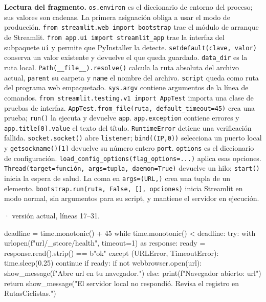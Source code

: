 \documentclass[11pt,a4paper]{article}
\begin{document}
\textbf{Lectura del fragmento.} \texttt{os.environ} es el diccionario de entorno del proceso; sus valores son cadenas. La primera asignación obliga a usar el modo de producción. \texttt{from streamlit.web import bootstrap} trae el módulo de arranque de Streamlit. \texttt{from app.ui import streamlit\_app} trae la interfaz del subpaquete \texttt{ui} y permite que PyInstaller la detecte. \texttt{setdefault(clave, valor)} conserva un valor existente y devuelve el que queda guardado. \texttt{data\_dir} es la ruta local. \texttt{Path(\_\_file\_\_).resolve()} calcula la ruta absoluta del archivo actual, \texttt{parent} su carpeta y \texttt{name} el nombre del archivo. \texttt{script} queda como ruta del programa web empaquetado. \texttt{sys.argv} contiene argumentos de la línea de comandos. \texttt{from streamlit.testing.v1 import AppTest} importa una clase de pruebas de interfaz. \texttt{AppTest.from\_file(ruta, default\_timeout=45)} crea una prueba; \texttt{run()} la ejecuta y devuelve \texttt{app}. \texttt{app.exception} contiene errores y \texttt{app.title[0].value} el texto del título. \texttt{RuntimeError} detiene una verificación fallida. \texttt{socket.socket()} abre \texttt{listener}; \texttt{bind((IP,0))} selecciona un puerto local y \texttt{getsockname()[1]} devuelve su número entero \texttt{port}. \texttt{options} es el diccionario de configuración. \texttt{load\_config\_options(flag\_options=...)} aplica esas opciones. \texttt{Thread(target=función, args=tupla, daemon=True)} devuelve un hilo; \texttt{start()} inicia la espera de salud. La coma en \texttt{args=(URL,)} crea una tupla de un elemento. \texttt{bootstrap.run(ruta, False, [], opciones)} inicia Streamlit en modo normal, sin argumentos para su script, y mantiene el servidor en ejecución.


\smallskip
{\footnotesize\texttt{} · versión actual, líneas 17--31.}\par
\begin{Codigo}[firstnumber=17]
    deadline = time.monotonic() + 45
    while time.monotonic() < deadline:
        try:
            with urlopen(f"{url}/_stcore/health", timeout=1) as response:
                ready = response.read().strip() == b"ok"
        except (URLError, TimeoutError):
            time.sleep(0.25)
            continue
        if ready:
            if not webbrowser.open(url):
                show_message(f"Abre {url} en tu navegador.")
            else:
                print(f"Navegador abierto: {url}")
            return
    show_message("El servidor local no respondió. Revisa el registro en RutasCiclistas.")
\end{Codigo}
\end{document}
